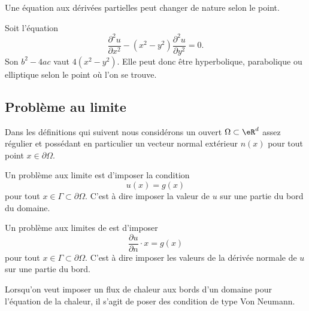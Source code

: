 Une équation aux dérivées partielles peut changer de nature selon le point.

\begin{example}
    Soit l'équation
    \begin{equation}
        \frac{ \partial^2u }{ \partial x^2 }-(x^2-y^2)\frac{ \partial^2u }{ \partial y^2 }=0.
    \end{equation}
    Son \( b^2-4ac\) vaut \( 4(x^2-y^2)\). Elle peut donc être hyperbolique, parabolique ou elliptique selon le point où l'on se trouve.
\end{example}

\subsection{Problème au limite}

Dans les définitions qui suivent nous considérons un ouvert \( \Omega\subset \eR^d\) assez régulier et possédant en particulier un vecteur normal extérieur \( n(x)\) pour tout point \( x\in\partial\Omega\).

\begin{definition}
    Un problème aux limite  est d'imposer la condition
    \begin{equation}
        u(x)=g(x)
    \end{equation}
    pour tout \( x\in\Gamma\subset \partial\Omega\). C'est à dire imposer la valeur de \( u\) sur une partie du bord du domaine.
\end{definition}

\begin{definition}
    Un problème aux limites de  est d'imposer
    \begin{equation}
        \frac{ \partial u }{ \partial n }\cdot x=g(x)
    \end{equation}
    pour tout \( x\in\Gamma\subset\partial\Omega\). C'est à dire imposer les valeurs de la dérivée normale de \( u\) sur une partie du bord.
\end{definition}

\begin{example}
    Lorsqu'on veut imposer un flux de chaleur aux bords d'un domaine pour l'équation de la chaleur, il s'agit de poser des condition de type Von Neumann.
\end{example}

